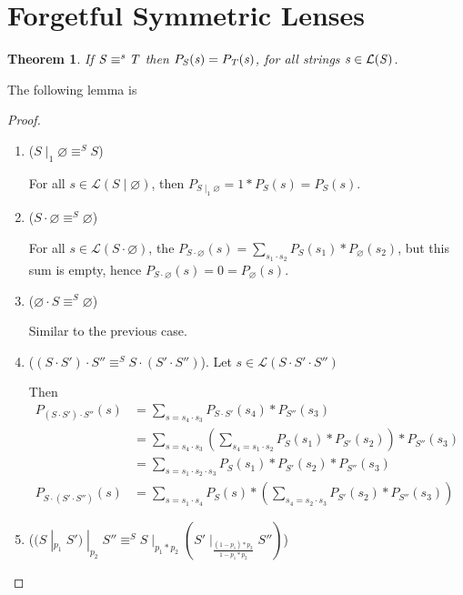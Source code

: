 \documentclass[acmsmall,screen,anonymous]{acmart}
\newtheorem*{theorem*}{Theorem}
\begin{document}
\section{Forgetful Symmetric Lenses}
\begin{theorem*}
  If $\mathit{S} \equiv^s \mathit{T}$ then $P_{\mathit{S}}(\mathit{s}) =
  P_{\mathit{T}}(\mathit{s})$, for all strings $\mathit{s} \in \mathcal{L}(\mathit{S})$.
\end{theorem*}
The following lemma is
\begin{proof}
\begin{enumerate}

\item
($S \; |_1 \; \varnothing \equiv^S S$)

For all $s \in \mathcal{L}(S \; | \; \varnothing)$, then $P_{S \; |_1 \; \varnothing} = 1 * P_S(s) = P_S(s)$.
\item
($S \cdot \varnothing \equiv^S \varnothing$)

For all $s \in \mathcal{L}(S \cdot \varnothing)$, the $P_{S \cdot \varnothing}(s) = \sum_{s_1 \cdot s_2}P_S(s_1) * P_{\varnothing}(s_2)$, but this sum is empty, hence $P_{S \cdot \varnothing}(s) = 0 = P_{\varnothing}(s)$.
\item
($\varnothing \cdot S \equiv^S \varnothing$)

Similar to the previous case.
\item
($(S \cdot S') \cdot S'' \equiv^S S \cdot (S' \cdot S'')$). Let $s \in \mathcal{L}(S \cdot S' \cdot S'')$

Then
\begin{align*}
P_{(S \cdot S') \cdot S''}(s) &= \sum_{s=s_4 \cdot s_3}P_{S \cdot S'}(s_4) * P_{S''}(s_3)\\
&= \sum_{s=s_4 \cdot s_3}\left(\sum_{s_4=s_1 \cdot s_2} P_{S}(s_1) * P_{S'}(s_2)\right)* P_{S''}(s_3)\\
&= \sum_{s=s_1\cdot s_2 \cdot s_3} P_{S}(s_1) * P_{S'}(s_2) * P_{S''}(s_3)\\
P_{S \cdot (S' \cdot S'')}(s) &= \sum_{s=s_1\cdot s_4} P_{S}(s) * \left(\sum_{s_4=s_2\cdot s_3}P_{S'}(s_2) * P_{S''}(s_3)\right)
\end{align*}
\item
($(S \; |_{p_1} \; S') \; |_{p_2} \; S'' \equiv^S S \; |_{p_1 * p_2} \; (S' \; |_{\frac{(1-p_1)*p_2}{1-p_1*p_2}} \; S'')$)


\end{enumerate}
\end{proof}
\end{document}

